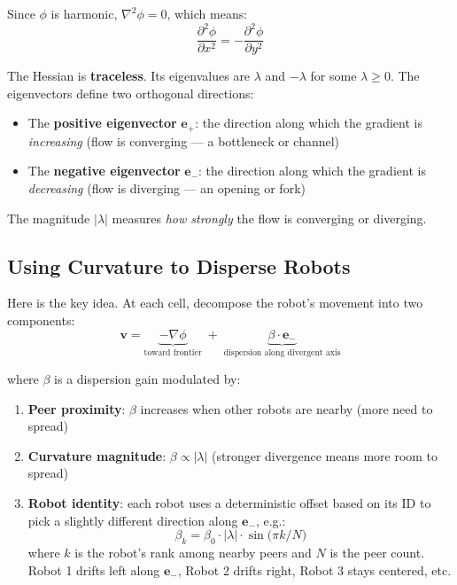 \documentclass[11pt]{article}
\begin{document}
Since $\phi$ is harmonic, $\nabla^2\phi = 0$, which means:
\begin{equation}
    \frac{\partial^2\phi}{\partial x^2} =
    -\frac{\partial^2\phi}{\partial y^2}
    \label{eq:trace_zero}
\end{equation}

The Hessian is \textbf{traceless}.  Its eigenvalues are
$\lambda$ and $-\lambda$ for some $\lambda \geq 0$.  The
eigenvectors define two orthogonal directions:
\begin{itemize}
    \item The \textbf{positive eigenvector} $\mathbf{e}_+$: the
    direction along which the gradient is \emph{increasing}
    (flow is converging --- a bottleneck or channel)
    \item The \textbf{negative eigenvector} $\mathbf{e}_-$: the
    direction along which the gradient is \emph{decreasing}
    (flow is diverging --- an opening or fork)
\end{itemize}

The magnitude $|\lambda|$ measures \emph{how strongly} the flow
is converging or diverging.

\subsection{Using Curvature to Disperse Robots}

Here is the key idea.  At each cell, decompose the robot's movement
into two components:
\begin{equation}
    \mathbf{v} = \underbrace{-\nabla\phi}_{\text{toward frontier}}
    \;+\; \underbrace{\beta \cdot
    \mathbf{e}_-}_{\text{dispersion along divergent axis}}
    \label{eq:dispersion}
\end{equation}

where $\beta$ is a dispersion gain modulated by:
\begin{enumerate}
    \item \textbf{Peer proximity}: $\beta$ increases when other
    robots are nearby (more need to spread)
    \item \textbf{Curvature magnitude}: $\beta \propto |\lambda|$
    (stronger divergence means more room to spread)
    \item \textbf{Robot identity}: each robot uses a deterministic
    offset based on its ID to pick a slightly different direction
    along $\mathbf{e}_-$, e.g.:
    \begin{equation}
        \beta_k = \beta_0 \cdot |\lambda| \cdot
        \sin\!\bigl(\pi k / N\bigr)
    \end{equation}
    where $k$ is the robot's rank among nearby peers and $N$ is
    the peer count.  Robot 1 drifts left along $\mathbf{e}_-$,
    Robot 2 drifts right, Robot 3 stays centered, etc.
\end{enumerate}
\end{document}
